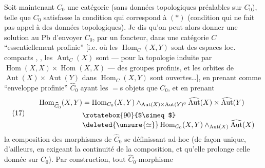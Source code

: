 Soit maintenant $C_0$ une catégorie (sans
données topologiques préalables sur $C_0$),
telle que $C_0$ satisfasse la condition
qui correspond à $(*)$ (condition qui ne
fait pas appel à des données topologiques).
Je dis qu'on peut alors donner une
solution au Pb d'envoyer $C_0$, par un foncteur,
dans une catégorie $C$ ``essentiellement profinie''
[i.e. où les $\operatorname{Hom}_C(X,Y)$ sont des espaces loc. compacts
, , les $\operatorname{Aut}_C(X)$ sont --- pour la topologie
induite par $\operatorname{Hom}(X,X)\times\operatorname{Hom}(X,X)$ --- des
groupes profinis, et les orbites de $\operatorname{Aut}(X)\times\operatorname{Aut}(Y)$
dans $\operatorname{Hom}_C(X,Y)$ sont ouvertes\ldots], en prenant
comme ``enveloppe profinie'' $\widehat C_0$  ayant les
$=$s  objets que $C_0$, et en prenant
\[
(17)\qquad\begin{aligned}
\operatorname{Hom}_{\widehat C_0}(X,Y)&=\operatorname{Hom}_{C_0}(X,Y)\mathbin{\wedge}_{\operatorname{Aut}(X)\times\operatorname{Aut}(Y)^0}\widehat{\operatorname{Aut}}(X)\times\widehat{\operatorname{Aut}}(Y)\\
&\rotatebox{90}{$\simeq$}\\[-1ex]
&\deleted{\unsure{\simeq}}\operatorname{Hom}_{C_0}(X,Y)\mathbin{\wedge}_{\operatorname{Aut}(X)}\widehat{\operatorname{Aut}}(X)
\end{aligned}
\]
la composition des morphismes de $\widehat C_0$ se
définissant ad-hoc (de façon unique, d'ailleurs,
en exigeant la continuité de la composition, et
qu'elle prolonge celle donnée sur $C_0$).
Par construction, tout $\widehat C_0$-morphisme
